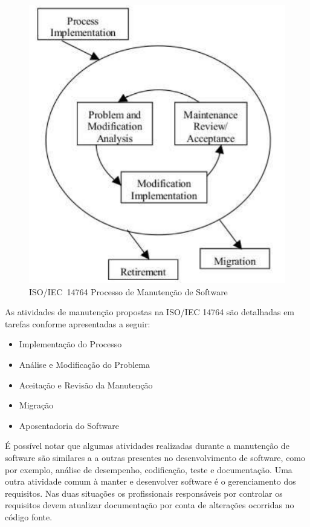 \begin{figure}[htpb]
	\centering
	\includegraphics[width=0.8\linewidth]{chapter-manutencao-software-visao-geral/img/ieee-14764-processo-manutencao.pdf}
	\caption{ISO/IEC~14764 Processo de Manutenção de Software}
	\label{fig:ieee-14764-processo-manutencao}
\end{figure}

As atividades de manutenção propostas na ISO/IEC 14764 são detalhadas em tarefas conforme apresentadas
a seguir:

\begin{itemize}
	\item Implementação do Processo
	\item Análise e Modificação do Problema
	\item Aceitação e Revisão da Manutenção
	\item Migração
	\item Aposentadoria do Software	
\end{itemize}

É possível notar que algumas atividades realizadas durante a manutenção de software são similares a
a outras presentes no desenvolvimento de software, como por exemplo, análise de desempenho,
codificação, teste e documentação. Uma outra atividade comum à manter e desenvolver software é o
gerenciamento dos requisitos. Nas duas situações os profissionais responsáveis por controlar os
requisitos devem atualizar documentação  por conta de alterações ocorridas no código fonte. 

